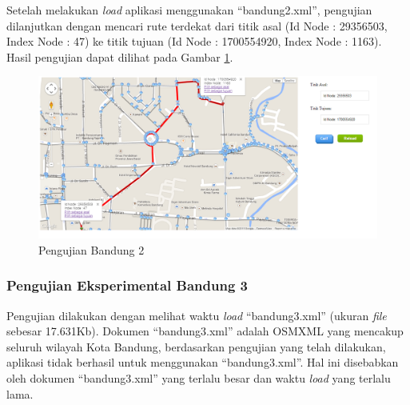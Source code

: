 Setelah melakukan \textit{load} aplikasi menggunakan ``bandung2.xml'', pengujian
dilanjutkan dengan mencari rute terdekat dari titik asal (Id Node : 29356503,
Index Node : 47) ke titik tujuan (Id Node : 1700554920, Index Node : 1163).
Hasil pengujian dapat dilihat pada Gambar \ref{fig:pu_bandung2_rute}.
\begin{figure}[h]
\centering
\includegraphics[scale=0.45]{Gambar/pu_bandung2_rute}
\caption[Pengujian Bandung 2]{Pengujian Bandung 2}
\label{fig:pu_bandung2_rute}
\end{figure}

\subsubsection{Pengujian Eksperimental Bandung 3}
Pengujian dilakukan dengan melihat waktu \textit{load} ``bandung3.xml'' (ukuran
\textit{file} sebesar 17.631Kb). Dokumen ``bandung3.xml'' adalah OSMXML yang
mencakup seluruh wilayah Kota Bandung, berdasarkan pengujian yang telah dilakukan, 
aplikasi tidak berhasil untuk menggunakan ``bandung3.xml''. Hal ini disebabkan oleh 
dokumen ``bandung3.xml'' yang terlalu besar dan waktu \textit{load} yang terlalu
lama.

